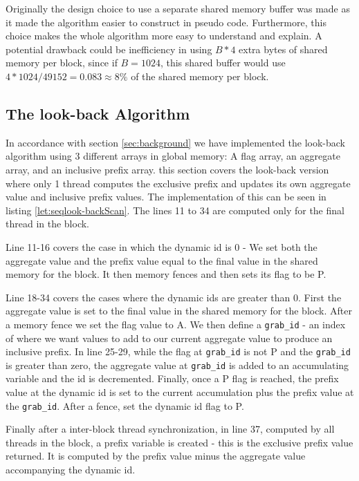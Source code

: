 \documentclass[twocolumn]{article}
\begin{document}
Originally the design choice to use a separate shared memory buffer was made as it made the algorithm easier to construct in pseudo code. Furthermore, this choice makes the whole algorithm more easy to understand and explain. A potential drawback could be inefficiency in using $B*4$ extra bytes of shared memory per block, since if $B=1024$, this shared buffer would use $4*1024/49152 = 0.083\approx 8\%$ of the shared memory per block.

\subsection{The look-back Algorithm}
\label{sec:impl-look-back-alg}

In accordance with section \ref{sec:background} we have implemented the look-back algorithm using 3 different arrays in global memory: A flag array, an aggregate array, and an inclusive prefix array. this section covers the look-back version where only 1 thread computes the exclusive prefix and updates its own aggregate value and inclusive prefix values. The implementation of this can be seen in listing \ref{let:seqlook-backScan}. The lines 11 to 34 are computed only for the final thread in the block.

Line 11-16 covers the case in which the dynamic id is 0 - We set both the aggregate value and the prefix value equal to the final value in the shared memory for the block. It then memory fences and then sets its flag to be P.

Line 18-34 covers the cases where the dynamic ids are greater than 0. First the aggregate value is set to the final value in the shared memory for the block. After a memory fence we set the flag value to A. We then define a \verb|grab_id| - an index of where we want values to add to our current aggregate value to produce an inclusive prefix. In line 25-29, while the flag at \verb|grab_id| is not P and the \verb|grab_id| is greater than zero, the aggregate value at \verb|grab_id| is added to an accumulating variable and the id is decremented. Finally, once a P flag is reached, the prefix value at the dynamic id is set to the current accumulation plus the prefix value at the \verb|grab_id|. After a fence, set the dynamic id flag to P.

Finally after a inter-block thread synchronization, in line 37, computed by all threads in the block, a prefix variable is created - this is the exclusive prefix value returned. It is computed by the prefix value minus the aggregate value accompanying the dynamic id.
\end{document}
